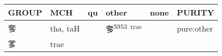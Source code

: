\documentclass[14pt,a4paper]{scrartcl}
\begin{document}
\begin{longtable}[c]{@{}llllll@{}}
\toprule
\begin{minipage}[b]{0.14\columnwidth}\raggedright\strut
GROUP
\strut\end{minipage} &
\begin{minipage}[b]{0.14\columnwidth}\raggedright\strut
MCH
\strut\end{minipage} &
\begin{minipage}[b]{0.14\columnwidth}\raggedright\strut
qu
\strut\end{minipage} &
\begin{minipage}[b]{0.14\columnwidth}\raggedright\strut
other
\strut\end{minipage} &
\begin{minipage}[b]{0.14\columnwidth}\raggedright\strut
none
\strut\end{minipage} &
\begin{minipage}[b]{0.14\columnwidth}\raggedright\strut
PURITY
\strut\end{minipage}\tabularnewline
\midrule
\endhead
\begin{minipage}[t]{0.14\columnwidth}\raggedright\strut
奓
\strut\end{minipage} &
\begin{minipage}[t]{0.14\columnwidth}\raggedright\strut
tha, taH
\strut\end{minipage} &
\begin{minipage}[t]{0.14\columnwidth}\raggedright\strut
\strut\end{minipage} &
\begin{minipage}[t]{0.14\columnwidth}\raggedright\strut
奓\textsuperscript{5953~trae}
\strut\end{minipage} &
\begin{minipage}[t]{0.14\columnwidth}\raggedright\strut
\strut\end{minipage} &
\begin{minipage}[t]{0.14\columnwidth}\raggedright\strut
pure:other
\strut\end{minipage}\tabularnewline
\begin{minipage}[t]{0.14\columnwidth}\raggedright\strut
㗬
\strut\end{minipage} &
\begin{minipage}[t]{0.14\columnwidth}\raggedright\strut
trae
\strut\end{minipage} &
\begin{minipage}[t]{0.14\columnwidth}\raggedright\strut
\strut\end{minipage} &

\end{longtable}
\end{document}
